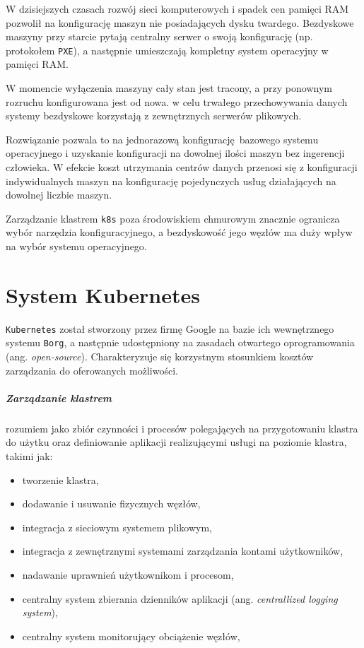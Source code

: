 \documentclass[a4paper,12pt,twoside,openany]{report}
\providecommand{\tightlist}{%
  \setlength{\itemsep}{0pt}\setlength{\parskip}{0pt}}
\newcommand{\passthrough}[1]{#1}
\renewcommand{\href}[2]{#2\endnote{\url{#1}}}
\begin{document}
W dzisiejszych czasach rozwój sieci komputerowych i spadek cen pamięci
RAM pozwolił na konfigurację maszyn nie posiadających dysku twardego.
Bezdyskowe maszyny przy starcie pytają centralny serwer o swoją
konfigurację (np. protokołem \passthrough{\lstinline!PXE!}), a następnie
umieszczają kompletny system operacyjny w pamięci RAM.

W momencie wyłączenia maszyny cały stan jest tracony, a przy ponownym
rozruchu konfigurowana jest od nowa. w celu trwałego przechowywania
danych systemy bezdyskowe korzystają z zewnętrznych serwerów plikowych.

Rozwiązanie pozwala to na jednorazową konfigurację~bazowego systemu
operacyjnego i uzyskanie konfiguracji na dowolnej ilości maszyn bez
ingerencji człowieka. W efekcie koszt utrzymania centrów danych przenosi
się z konfiguracji indywidualnych maszyn na konfigurację pojedynczych
usług działających na dowolnej liczbie maszyn.

Zarządzanie klastrem \passthrough{\lstinline!k8s!} poza środowiskiem
chmurowym znacznie ogranicza wybór narzędzia konfiguracyjnego, a
bezdyskowość jego węzłów ma duży wpływ na wybór systemu operacyjnego.

\hypertarget{system-kubernetes}{%
\chapter{System Kubernetes}\label{system-kubernetes}}

\href{https://kubernetes.io/}{\passthrough{\lstinline!Kubernetes!}}
został stworzony przez firmę Google na bazie ich wewnętrznego systemu
\passthrough{\lstinline!Borg!}, a następnie udostępniony na zasadach
otwartego oprogramowania (ang. \emph{open-source}). Charakteryzuje się
korzystnym stosunkiem kosztów zarządzania do oferowanych możliwości.

\hypertarget{zarzux105dzanie-klastrem}{%
\paragraph{Zarządzanie klastrem}\label{zarzux105dzanie-klastrem}}

rozumiem jako zbiór czynności i procesów polegających na przygotowaniu
klastra do użytku oraz definiowanie aplikacji realizującymi usługi na
poziomie klastra, takimi jak:

\begin{itemize}
\tightlist
\item
  tworzenie klastra,
\item
  dodawanie i usuwanie fizycznych węzłów,
\item
  integracja z sieciowym systemem plikowym,
\item
  integracja z zewnętrznymi systemami zarządzania kontami użytkowników,
\item
  nadawanie uprawnień użytkownikom i procesom,
\item
  centralny system zbierania dzienników aplikacji (ang.
  \emph{centrallized logging system}),
\item
  centralny system monitorujący obciążenie węzłów,
\end{itemize}
\end{document}
